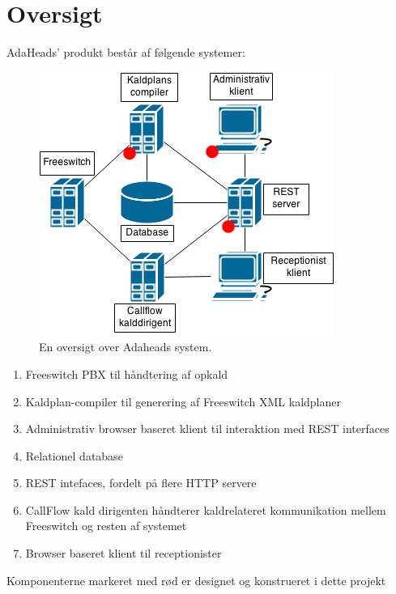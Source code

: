 \section{Oversigt}
AdaHeads' produkt består af følgende systemer:
\begin{figure}[ht!]
\centering
\includegraphics[scale=0.5]{images/adaheads_system.png}
\caption{En oversigt over Adaheads system.}
\label{fig:adaheadssystem}
\end{figure}
\begin{enumerate}
	\item{Freeswitch PBX til håndtering af opkald} 
	\item{Kaldplan-compiler til generering af Freeswitch XML kaldplaner}
	\item{Administrativ browser baseret klient til interaktion med REST interfaces}
	\item{Relationel database}
	\item{REST intefaces, fordelt på flere HTTP servere}
	\item{CallFlow kald dirigenten håndterer kaldrelateret kommunikation mellem Freeswitch og resten af systemet}
	\item{Browser baseret klient til receptionister}
\end{enumerate}
Komponenterne markeret med rød er designet og konstrueret i dette projekt

\pagebreak


